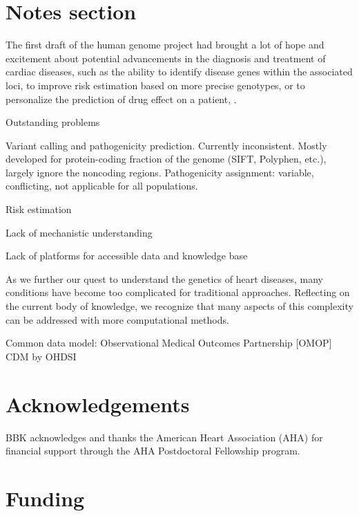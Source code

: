 \documentclass[letter]{bioinfo}
\begin{document}
	
	\section*{Notes section}
	
	
	The first draft of the human genome project had brought a lot of hope and excitement about potential advancements in the diagnosis and treatment of cardiac diseases, such as the ability to identify disease genes within the associated loci, to improve risk estimation based on more precise genotypes, or to personalize the prediction of drug effect on a patient, \citep{Komajda:2001:heart}.
	
	
	Outstanding problems
	
	Variant calling and pathogenicity prediction. Currently inconsistent. Mostly developed for protein-coding fraction of the genome (SIFT, Polyphen, etc.), largely ignore the noncoding regions.
	Pathogenicity assignment: variable, conflicting, not applicable for all populations.
	
	Risk estimation
	
	Lack of mechanistic understanding
	
	Lack of platforms for accessible data and knowledge base
	
	
	As we further our quest to understand the genetics of heart diseases, many conditions have become too complicated for traditional approaches. Reflecting on the current body of knowledge, we recognize that many aspects of this complexity can be addressed with more computational methods.

	Common data model: Observational Medical Outcomes Partnership [OMOP] CDM by OHDSI
	

	\enlargethispage{12pt}
	
	
	
	
	\section*{Acknowledgements}
	
	BBK acknowledges and thanks the American Heart Association (AHA) for financial support through the AHA Postdoctoral Fellowship program.
	\vspace*{-12pt}
	
	\section*{Funding}
	
\end{document}
